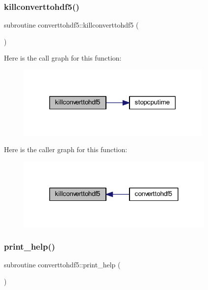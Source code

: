 \subsubsection{\texorpdfstring{killconverttohdf5()}{killconverttohdf5()}}
{\footnotesize\ttfamily subroutine converttohdf5\+::killconverttohdf5 (\begin{DoxyParamCaption}{ }\end{DoxyParamCaption})}

Here is the call graph for this function\+:\nopagebreak
\begin{figure}[H]
\begin{center}
\leavevmode
\includegraphics[width=272pt]{_convert_to_h_d_f5_8_f90_ae1cc4187af20917b66ab29a90f402338_cgraph}
\end{center}
\end{figure}
Here is the caller graph for this function\+:\nopagebreak
\begin{figure}[H]
\begin{center}
\leavevmode
\includegraphics[width=276pt]{_convert_to_h_d_f5_8_f90_ae1cc4187af20917b66ab29a90f402338_icgraph}
\end{center}
\end{figure}
\mbox{\label{_convert_to_h_d_f5_8_f90_a69583c57127dc2e683fb385db8cc755c}} 
\subsubsection{\texorpdfstring{print\+\_\+help()}{print\_help()}}
{\footnotesize\ttfamily subroutine converttohdf5\+::print\+\_\+help (\begin{DoxyParamCaption}{ }\end{DoxyParamCaption})}

